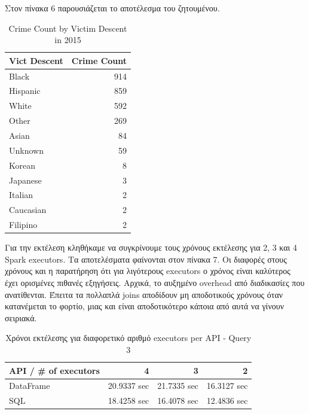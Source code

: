 \documentclass{article}
\begin{document}
Στον πίνακα 6 παρουσιάζεται το αποτέλεσμα του ζητουμένου. 
\begin{table}[h]
\centering
\begin{tabular}{|l|r|}
\hline
\textbf{Vict Descent} & \textbf{Crime Count} \\ \hline
Black                & 914                  \\ \hline
Hispanic             & 859                  \\ \hline
White                & 592                  \\ \hline
Other                & 269                  \\ \hline
Asian                & 84                   \\ \hline
Unknown              & 59                   \\ \hline
Korean               & 8                    \\ \hline
Japanese             & 3                    \\ \hline
Italian              & 2                    \\ \hline
Caucasian            & 2                    \\ \hline
Filipino             & 2                    \\ \hline
\end{tabular}
\caption{Crime Count by Victim Descent in 2015}
\label{table:crime_by_descent}
\end{table}

Για την εκτέλεση κληθήκαμε να συγκρίνουμε τους χρόνους εκτέλεσης για 2, 3 και 4  Spark executors. Τα αποτελέσματα φαίνονται στον πίνακα 7. Οι διαφορές στους χρόνους και η παρατήρηση ότι για λιγότερους  executors  ο χρόνος είναι καλύτερος έχει ορισμένες πιθανές εξηγήσεις. Αρχικά, το αυξημένο  overhead  από διαδικασίες που ανατίθενται. Έπειτα τα πολλαπλά  joins  αποδίδουν μη αποδοτικούς χρόνους όταν κατανέμεται το φορτίο, μιας και είναι αποδοτικότερο κάποια από αυτά να γίνουν σειριακά.
\begin{table}[h]
\centering
\begin{tabular}{|l|r|r|r|}
\hline
API / \# of executors & 4             & 3             & 2             \\ \hline
DataFrame            & 20.9337 sec & 21.7335 sec & 16.3127 sec \\ \hline
SQL           & 18.4258 sec & 16.4078 sec & 12.4836 sec \\ \hline
\end{tabular}
\caption{ Χρόνοι εκτέλεσης για διαφορετικό αριθμό executors per API - Query 3}
\label{table:query3_execution_different_executors}

\end{table}
\end{document}
